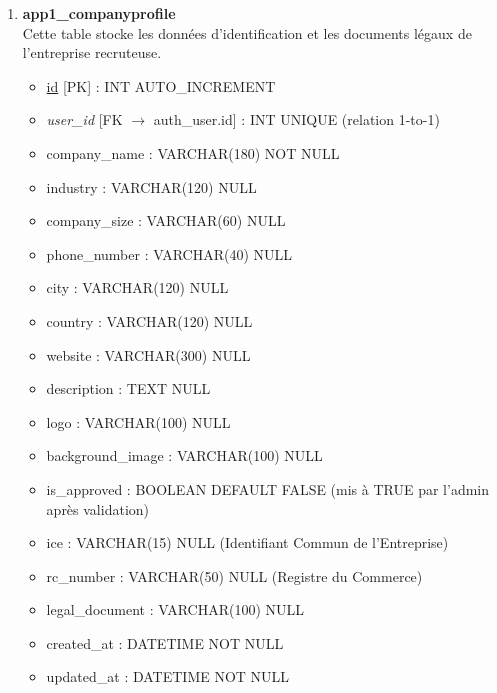 \begin{enumerate}
    \item \textbf{app1\_companyprofile} \\
    Cette table stocke les données d'identification et les documents légaux de l'entreprise recruteuse.
    \begin{itemize}
        \item \underline{id} [PK] : INT AUTO\_INCREMENT
        \item \textit{user\_id} [FK $\rightarrow$ auth\_user.id] : INT UNIQUE (relation 1-to-1)
        \item company\_name : VARCHAR(180) NOT NULL
        \item industry : VARCHAR(120) NULL
        \item company\_size : VARCHAR(60) NULL
        \item phone\_number : VARCHAR(40) NULL
        \item city : VARCHAR(120) NULL
        \item country : VARCHAR(120) NULL
        \item website : VARCHAR(300) NULL
        \item description : TEXT NULL
        \item logo : VARCHAR(100) NULL
        \item background\_image : VARCHAR(100) NULL
        \item is\_approved : BOOLEAN DEFAULT FALSE (mis à TRUE par l'admin après validation)
        \item ice : VARCHAR(15) NULL (Identifiant Commun de l'Entreprise)
        \item rc\_number : VARCHAR(50) NULL (Registre du Commerce)
        \item legal\_document : VARCHAR(100) NULL
        \item created\_at : DATETIME NOT NULL
        \item updated\_at : DATETIME NOT NULL
    \end{itemize}


\end{enumerate}
